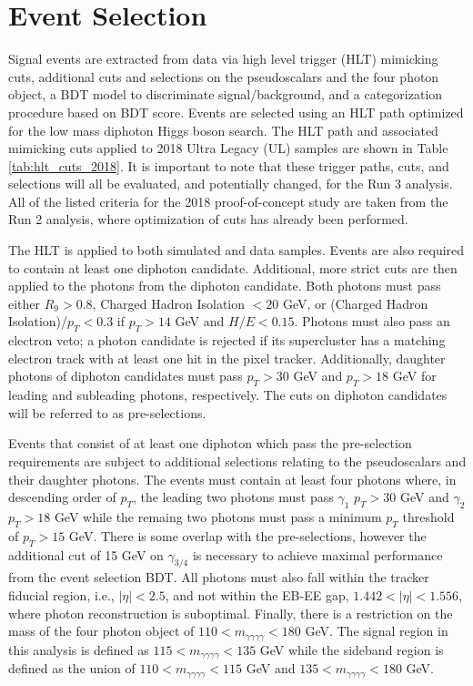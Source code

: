 \documentclass[12pt]{article}
\begin{document}
\section{Event Selection}
Signal events are extracted from data via high level trigger (HLT) mimicking cuts, additional cuts and selections on the pseudoscalars and the four photon object, a BDT model to discriminate signal/background, and a categorization procedure based on BDT score. Events are selected using an HLT path optimized for the low mass diphoton Higgs boson search. The HLT path and associated mimicking cuts applied to 2018 Ultra Legacy (UL) samples are shown in Table \ref{tab:hlt_cuts_2018}. It is important to note that these trigger paths, cuts, and selections will all be evaluated, and potentially changed, for the Run 3 analysis. All of the listed criteria for the 2018 proof-of-concept study are taken from the Run 2 analysis, where optimization of cuts has already been performed.\par

The HLT is applied to both simulated and data samples. Events are also required to contain at least one diphoton candidate. Additional, more strict cuts are then applied to the photons from the diphoton candidate. Both photons must pass either $R_9 > 0.8$, Charged Hadron Isolation $<20$ GeV, or (Charged Hadron Isolation)/$p_T < 0.3$ if $p_T > 14$ GeV and $H/E < 0.15$. Photons must also pass an electron veto; a photon candidate is rejected if its supercluster has a matching electron track with at least one hit in the pixel tracker. Additionally, daughter photons of diphoton candidates must pass $p_T > 30$ GeV and $p_T > 18$ GeV for leading and subleading photons, respectively. The cuts on diphoton candidates will be referred to as pre-selections.\par

Events that consist of at least one diphoton which pass the pre-selection requirements are subject to additional selections relating to the pseudoscalars and their daughter photons. The events must contain at least four photons where, in descending order of $p_T$, the leading two photons must pass $\gamma_1$ $p_T > 30$ GeV and $\gamma_2$ $p_T > 18$ GeV while the remaing two photons must pass a minimum $p_T$ threshold of $p_{T} > 15$ GeV. There is some overlap with the pre-selections, however the additional cut of 15 GeV on $\gamma_{3/4}$ is necessary to achieve maximal performance from the event selection BDT. All photons must also fall within the tracker fiducial region, i.e., $|\eta| < 2.5$, and not within the EB-EE gap, $1.442 < |\eta| < 1.556$, where photon reconstruction is suboptimal. Finally, there is a restriction on the mass of the four photon object of $110 < m_{\gamma \gamma \gamma \gamma} < 180$ GeV. The signal region in this analysis is defined as $115 < m_{\gamma \gamma \gamma \gamma} < 135$ GeV while the sideband region is defined as the union of $110 < m_{\gamma \gamma \gamma \gamma} < 115$ GeV and $135 < m_{\gamma \gamma \gamma \gamma} < 180$ GeV.
\end{document}
